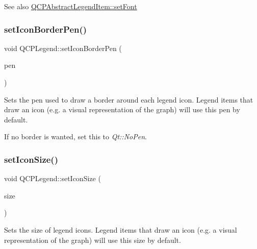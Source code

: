 \begin{DoxySeeAlso}{See also}
\hyperlink{class_q_c_p_abstract_legend_item_a409c53455d8112f71d70c0c43eb10265}{Q\+C\+P\+Abstract\+Legend\+Item\+::set\+Font} 
\end{DoxySeeAlso}
\mbox{\label{class_q_c_p_legend_a2f2c93d18a651f4ff294bb3f026f49b8}} 
\subsubsection{\texorpdfstring{set\+Icon\+Border\+Pen()}{setIconBorderPen()}}
{\footnotesize\ttfamily void Q\+C\+P\+Legend\+::set\+Icon\+Border\+Pen (\begin{DoxyParamCaption}\item[{const Q\+Pen \&}]{pen }\end{DoxyParamCaption})}

Sets the pen used to draw a border around each legend icon. Legend items that draw an icon (e.\+g. a visual representation of the graph) will use this pen by default.

If no border is wanted, set this to {\itshape Qt\+::\+No\+Pen}. \mbox{\label{class_q_c_p_legend_a8b0740cce488bf7010da6beda6898984}} 
\subsubsection{\texorpdfstring{set\+Icon\+Size()}{setIconSize()}\hspace{0.1cm}{\footnotesize\ttfamily [1/2]}}
{\footnotesize\ttfamily void Q\+C\+P\+Legend\+::set\+Icon\+Size (\begin{DoxyParamCaption}\item[{const Q\+Size \&}]{size }\end{DoxyParamCaption})}

Sets the size of legend icons. Legend items that draw an icon (e.\+g. a visual representation of the graph) will use this size by default. \mbox{\label{class_q_c_p_legend_a96b1a37fd4ee6a9778e6e54fe56ab6c2}} 
